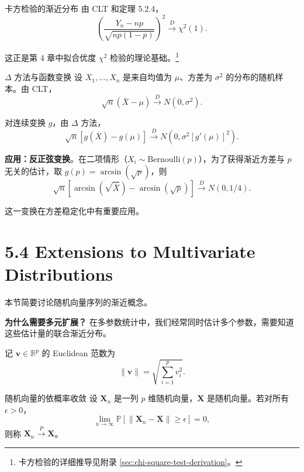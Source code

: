 \begin{example}{卡方检验的渐近分布}\label{ex:chi-square-test}
由 CLT 和定理 5.2.4，
\[
\left(\frac{Y_n - np}{\sqrt{np(1-p)}}\right)^2 \xrightarrow{D} \chi^2(1).
\label{eq:chi-square-from-clt}
\]

这正是第 4 章中拟合优度 $\chi^2$ 检验的理论基础。\footnote{卡方检验的详细推导见附录 \cref{sec:chi-square-test-derivation}。}
\end{example}

\begin{example}{$\Delta$ 方法与函数变换}\label{ex:delta-method-variance}
设 $X_1, \ldots, X_n$ 是来自均值为 $\mu$、方差为 $\sigma^2$ 的分布的随机样本。由 CLT，
\[
\sqrt{n}(\overline{X} - \mu) \xrightarrow{D} N(0, \sigma^2).
\label{eq:clt-for-delta}
\]

对连续变换 $g$，由 $\Delta$ 方法，
\[
\sqrt{n}[g(\overline{X}) - g(\mu)] \xrightarrow{D} N(0, \sigma^2 [g'(\mu)]^2).
\label{eq:delta-method-clt}
\]

\textbf{应用：反正弦变换}。在二项情形（$X_i \sim \mathrm{Bernoulli}(p)$），为了获得渐近方差与 $p$ 无关的估计，取 $g(p) = \arcsin(\sqrt{p})$，则
\[
\sqrt{n}[\arcsin(\sqrt{\overline{X}}) - \arcsin(\sqrt{p})] \xrightarrow{D} N(0, 1/4).
\label{eq:arcsin-transform}
\]

这一变换在方差稳定化中有重要应用。%
\end{example}

\section{5.4 Extensions to Multivariate Distributions}\label{sec:5.4}

本节简要讨论随机向量序列的渐近概念。

\textbf{为什么需要多元扩展？} 在多参数统计中，我们经常同时估计多个参数，需要知道这些估计量的联合渐近分布。

记 $\mathbf{v} \in \mathbb{R}^p$ 的 Euclidean 范数为
\[
\|\mathbf{v}\| = \sqrt{\sum_{i=1}^p v_i^2}.
\label{eq:euclidean-norm}
\]

\begin{definition}{随机向量的依概率收敛}\label{def:vector-convergence-probability}
设 ${\mathbf{X}_n}$ 是一列 $p$ 维随机向量，$\mathbf{X}$ 是随机向量。若对所有 $\epsilon > 0$，
\[
\lim_{n \to \infty} \mathbb{P}[\|\mathbf{X}_n - \mathbf{X}\| \geq \epsilon] = 0,
\]
则称 $\mathbf{X}_n \xrightarrow{P} \mathbf{X}$。
\end{definition}

